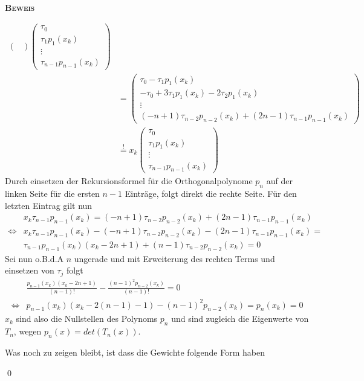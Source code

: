 \documentclass[12pt,a4paper]{scrartcl}
\numberwithin{equation}{section}
\numberwithin{myalgctr}{section}
\numberwithin{mytheoremctr}{subsection}
\numberwithin{mykorollarctr}{subsection}
\numberwithin{mylemmactr}{subsection}
\numberwithin{mybeispielctr}{subsection}
\newenvironment{myproof}{%
	\bigskip\noindent%
	\textsc{\textbf{\\Beweis\\}}%
	\indent
}{\qed\par\bigskip}  %
\begin{document}
\begin{myproof}
\begin{itemize}
\begin{align*}
\begin{pmatrix}
				\end{pmatrix}
				\begin{pmatrix}
					\tau_0 \\ \tau_1p_1(x_k) \\ \vdots \\ \tau_{n-1}p_{n-1}(x_k)
				\end{pmatrix} \\
				& = 
				\begin{pmatrix}
				\tau_0 -\tau_1p_1(x_k)  \\ -\tau_0 + 3\tau_1p_1(x_k) - 2\tau_2p_1(x_k)\\ \vdots \\ (-n+1)\tau_{n-2}p_{n-2}(x_k) + (2n-1)\tau_{n-1}p_{n-1}(x_k) 
				\end{pmatrix} \\
				& \stackrel{!}{=}
				x_k	
				\begin{pmatrix}
				\tau_0 \\ \tau_1p_1(x_k) \\ \vdots \\ \tau_{n-1}p_{n-1}(x_k)
				\end{pmatrix}
			\end{align*}
			Durch einsetzen der Rekursionsformel für die Orthogonalpolynome $p_n$ auf der linken Seite für die ersten $n-1$ Einträge, folgt direkt die rechte Seite. Für den letzten Eintrag gilt nun
			\begin{align*}
				&x_k\tau_{n-1}p_{n-1}(x_k) = (-n+1)\tau_{n-2}p_{n-2}(x_k) + (2n-1)\tau_{n-1}p_{n-1}(x_k) \\
				\Leftrightarrow &  x_k\tau_{n-1}p_{n-1}(x_k) - (-n+1)\tau_{n-2}p_{n-2}(x_k) - (2n-1)\tau_{n-1}p_{n-1}(x_k) = \\
				& \tau_{n-1}p_{n-1}(x_k)(x_k-2n+1) + (n-1)\tau_{n-2}p_{n-2}(x_k) = 0
			\end{align*} 
			Sei nun o.B.d.A $n$ ungerade und mit Erweiterung des rechten Terms und einsetzen von $\tau_j$ folgt
			\begin{align*}
				&\frac{p_{n-1}(x_k)(x_k-2n+1)}{(n-1)!} - \frac{(n-1)^2p_{n-2}(x_k)}{(n-1)!} = 0 \\
				\Leftrightarrow & p_{n-1}(x_k)(x_k-2(n-1)-1) - (n-1)^2p_{n-2}(x_k) = p_n(x_k) = 0
			\end{align*}
			$x_k$ sind also die Nullstellen des Polynoms $p_n$ und sind zugleich die Eigenwerte von $T_n$, wegen $p_n(x) = det(T_n(x))$. \autocite[vgl. 40][]{übung}
		\end{itemize}
		Was noch zu  zeigen bleibt, ist dass die Gewichte folgende Form haben

\end{myproof}
\end{document}
